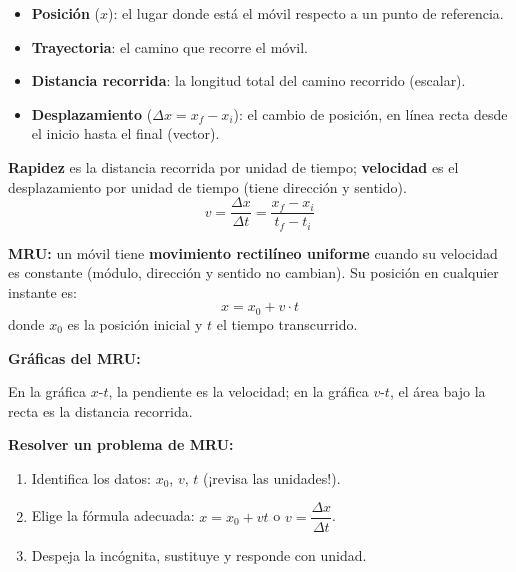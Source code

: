 \documentclass[12pt, letterpaper]{article}
\begin{document}
\begin{cuadroteoria}
  \begin{itemize}[leftmargin=*]
    \item \textbf{Posición} ($x$): el lugar donde está el móvil respecto a un punto de referencia.
    \item \textbf{Trayectoria}: el camino que recorre el móvil.
    \item \textbf{Distancia recorrida}: la longitud total del camino recorrido (escalar).
    \item \textbf{Desplazamiento} ($\Delta x = x_f - x_i$): el cambio de posición, en línea recta desde el inicio hasta el final (vector).
  \end{itemize}
  \textbf{Rapidez} es la distancia recorrida por unidad de tiempo; \textbf{velocidad} es el desplazamiento por unidad de tiempo (tiene dirección y sentido).
  $$v = \frac{\Delta x}{\Delta t} = \frac{x_f - x_i}{t_f - t_i}$$
\end{cuadroteoria}
\newpage
\begin{cuadroteoria}
  \textbf{MRU:} un móvil tiene \textbf{movimiento rectilíneo uniforme} cuando su velocidad es constante (módulo, dirección y sentido no cambian). Su posición en cualquier instante es:
  $$x = x_0 + v \cdot t$$
  donde $x_0$ es la posición inicial y $t$ el tiempo transcurrido.
\end{cuadroteoria}

\begin{cuadroteoria}
  \textbf{Gráficas del MRU:}
  \begin{center}
  \end{center}
  En la gráfica $x$-$t$, la pendiente es la velocidad; en la gráfica $v$-$t$, el área bajo la recta es la distancia recorrida.
\end{cuadroteoria}

\begin{cuadropasos}
  \textbf{Resolver un problema de MRU:}
  \begin{enumerate}[leftmargin=*]
    \item Identifica los datos: $x_0$, $v$, $t$ (¡revisa las unidades!).
    \item Elige la fórmula adecuada: $x = x_0 + v t$ o $v = \dfrac{\Delta x}{\Delta t}$.
    \item Despeja la incógnita, sustituye y responde con unidad.
  \end{enumerate}
\end{cuadropasos}
\end{document}
